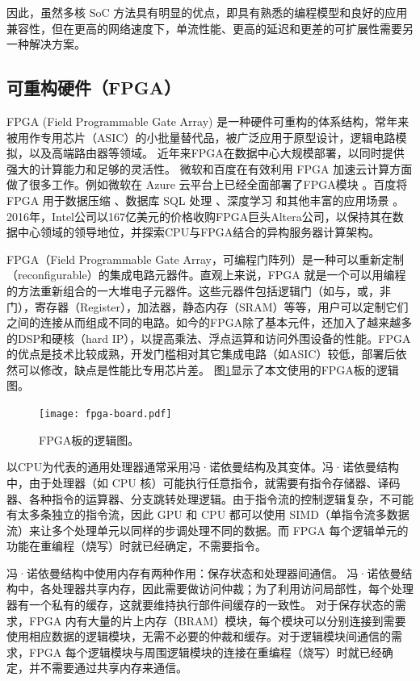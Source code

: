 因此，虽然多核 SoC 方法具有明显的优点，即具有熟悉的编程模型和良好的应用兼容性，但在更高的网络速度下，单流性能、更高的延迟和更差的可扩展性需要另一种解决方案。


\subsection{可重构硬件（FPGA）}
\label{smartnic-fpga}

FPGA (Field Programmable Gate Array) 是一种硬件可重构的体系结构，常年来被用作专用芯片（ASIC）的小批量替代品，被广泛应用于原型设计，逻辑电路模拟，以及高端路由器等领域。
近年来FPGA在数据中心大规模部署，以同时提供强大的计算能力和足够的灵活性。
微软和百度在有效利用 FPGA 加速云计算方面做了很多工作。例如微软在 Azure 云平台上已经全面部署了FPGA模块 \cite{putnam2014reconfigurable,caulfield2016cloud}。百度将 FPGA 用于数据压缩 \cite{ouyang2010fpga}、数据库 SQL 处理 \cite{baidu-fpga-sql}、深度学习 \cite{ouyang2014sda} 和其他丰富的应用场景 \cite{ouyang2017xpu}。
2016年，Intel公司以167亿美元的价格收购FPGA巨头Altera公司，以保持其在数据中心领域的领导地位，并探索CPU与FPGA结合的异构服务器计算架构。


FPGA（Field Programmable Gate Array，可编程门阵列）是一种可以重新定制（reconfigurable）的集成电路元器件。直观上来说，FPGA 就是一个可以用编程的方法重新组合的一大堆电子元器件。这些元器件包括逻辑门（如与，或，非门），寄存器（Register），加法器，静态内存（SRAM）等等，用户可以定制它们之间的连接从而组成不同的电路。如今的FPGA除了基本元件，还加入了越来越多的DSP和硬核（hard IP），以提高乘法、浮点运算和访问外围设备的性能。FPGA的优点是技术比较成熟，开发门槛相对其它集成电路（如ASIC）较低，部署后依然可以修改，缺点是性能比专用芯片差。
图\ref{clicknp:fig:fpga}显示了本文使用的FPGA板的逻辑图。


\begin{figure}[t]
	\centering
	\texttt{[image: fpga-board.pdf]}
	\caption{FPGA板的逻辑图。}
	\label{clicknp:fig:fpga}
\end{figure}



以CPU为代表的通用处理器通常采用冯·诺依曼结构及其变体。冯·诺依曼结构中，由于处理器（如 CPU 核）可能执行任意指令，就需要有指令存储器、译码器、各种指令的运算器、分支跳转处理逻辑。由于指令流的控制逻辑复杂，不可能有太多条独立的指令流，因此 GPU 和 CPU 都可以使用 SIMD（单指令流多数据流）来让多个处理单元以同样的步调处理不同的数据。而 FPGA 每个逻辑单元的功能在重编程（烧写）时就已经确定，不需要指令。

冯·诺依曼结构中使用内存有两种作用：保存状态和处理器间通信。
冯·诺依曼结构中，各处理器共享内存，因此需要做访问仲裁；为了利用访问局部性，每个处理器有一个私有的缓存，这就要维持执行部件间缓存的一致性。
对于保存状态的需求，FPGA 内有大量的片上内存（BRAM）模块，每个模块可以分别连接到需要使用相应数据的逻辑模块，无需不必要的仲裁和缓存。对于逻辑模块间通信的需求，FPGA 每个逻辑模块与周围逻辑模块的连接在重编程（烧写）时就已经确定，并不需要通过共享内存来通信。

